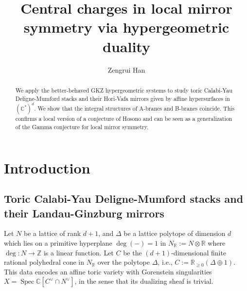 \documentclass[11pt,reqno]{amsart}
\def\C {{\mathbb C}}
\def\CC {{\mathbb C}}
\def\R {{\mathbb R}}
\def\Z {{\mathbb Z}}
\theoremstyle{definition}
\numberwithin{equation}{section}
\begin{document}
\title[Central charges in local mirror symmetry]{Central charges in local mirror symmetry via hypergeometric duality}

\begin{abstract}
We apply the better-behaved GKZ hypergeometric systems to study toric Calabi-Yau Deligne-Mumford stacks and their Hori-Vafa mirrors given by affine hypersurfaces in $(\C^*)^d$. We show that the integral structures of A-branes and B-branes coincide. This confirms a local version of a conjecture of Hosono and can be seen as a generalization of the Gamma conjecture for local mirror symmetry.



\end{abstract}



\author{Zengrui Han}
\address{Department of Mathematics\\
University of Maryland, College Park\\
College Park, MD, 20740} 

\maketitle


\tableofcontents

\section{Introduction}\label{introduction}

\subsection{Toric Calabi-Yau Deligne-Mumford stacks and their Landau-Ginzburg mirrors}\label{notation}

Let $N$ be a lattice of rank $d+1$, and $\Delta$ be a lattice polytope of dimension $d$ which lies on a primitive hyperplane $\deg(-)=1$ in $N_{\R}:=N\otimes\R$ where $\deg: N\rightarrow \Z$ is a linear function. Let $C$ be the $(d+1)$-dimensional finite rational polyhedral cone in $N_{\R}$ over the polytope $\Delta$, i.e., $C:=\R_{\geq 0}(\Delta\oplus 1)$. This data encodes an affine toric variety with Gorenstein singularities $X=\operatorname{Spec}\CC[C^{\vee}\cap N^{\vee}]$, in the sense that its dualizing sheaf is trivial.
\end{document}
